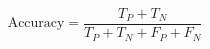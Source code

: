 \begin{equation}
  \label{eqn:accuracy}
  \text{Accuracy} = \frac{T_P + T_N}{T_P + T_N + F_P + F_N}
\end{equation}
